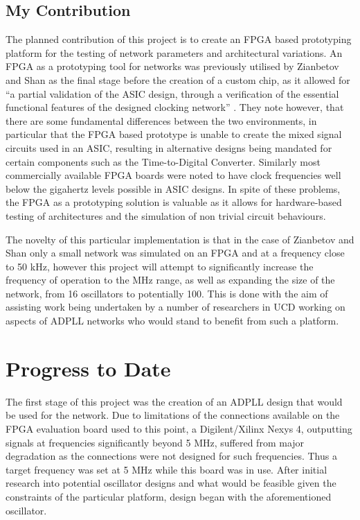 \documentclass[11pt,english,british]{report}
\begin{document}
\section{My Contribution}
The planned contribution of this project is to create an FPGA based prototyping platform for the testing of network parameters and architectural variations. An FPGA as a prototyping tool for networks was previously utilised by Zianbetov and Shan as the final stage before the creation of a custom chip, as it allowed for ``a partial validation of the ASIC design, through a verification of the essential functional features of the designed clocking network'' \cite{zianbetov2013phd,shan2014phd}. They note however, that there are some fundamental differences between the two environments, in particular that the FPGA based prototype is unable to create the mixed signal circuits used in an ASIC, resulting in alternative designs being mandated for certain components such as the Time-to-Digital Converter. Similarly most commercially available FPGA boards were noted to have clock frequencies well below the gigahertz levels possible in ASIC designs. In spite of these problems, the FPGA as a prototyping solution is valuable as it allows for hardware-based testing of architectures and the simulation of non trivial circuit behaviours.

The novelty of this particular implementation is that in the case of Zianbetov and Shan only a small network was simulated on an FPGA and at a frequency close to 50 kHz, however this project will attempt to significantly increase the frequency of operation to the MHz range, as well as expanding the size of the network, from 16 oscillators to potentially 100. This is done with the aim of assisting work being undertaken by a number of researchers in UCD working on aspects of ADPLL networks who would stand to benefit from such a platform.

\chapter{Progress to Date}
The first stage of this project was the creation of an ADPLL design that would be used for the network. Due to limitations of the connections available on the FPGA evaluation board used to this point, a Digilent/Xilinx Nexys 4, outputting signals at frequencies significantly beyond 5 MHz, suffered from major degradation as the connections were not designed for such frequencies. Thus a target frequency was set at 5 MHz while this board was in use. After initial research into potential oscillator designs and what would be feasible given the constraints of the particular platform, design began with the aforementioned oscillator.
\end{document}

